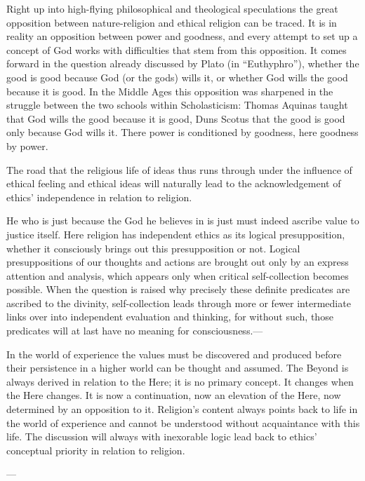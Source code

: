 \documentclass[12pt,a4paper]{book}
\newcommand{\opage}[1]{\marginnote{\footnotesize\textit{[#1]}}}
\begin{document}
Right up into high-flying philosophical and theological speculations the great opposition between
nature-religion and ethical religion can be traced. It is in reality an opposition between power and
goodness, and every attempt to set up a concept of God works with difficulties that stem from this
opposition. It comes forward in the question already discussed by Plato (in ``Euthyphro''), whether the good
is good because God (or the gods) wills it, or whether God wills the good because it is good. In the Middle
Ages this opposition was sharpened in the struggle between the two schools within Scholasticism: Thomas
Aquinas taught that God wills the good because it is good, Duns Scotus that the good is good only because
God wills it. There power is conditioned by goodness, here goodness by power.

The road that the religious life of ideas thus runs through under the influence of ethical feeling and
ethical ideas will naturally lead to the acknowledgement of ethics' independence in relation to religion.

He who is just because the God he believes in is just must indeed ascribe value to justice itself. Here
religion has independent ethics as its logical presupposition, whether it consciously brings out this
presupposition or not. Logical presuppositions of our thoughts and actions are brought out only by an
express attention and analysis, which appears only when critical self-collection becomes possible. When the
question is raised why precisely these definite predicates are ascribed to the divinity, self-collection
leads through more or fewer intermediate links over into independent evaluation and thinking, for without
such, those predicates will at last have no meaning for consciousness.---

In the world of experience the values must be discovered and produced before their persistence in a higher
world can be thought and assumed. The Beyond is always derived in relation to the Here; it 
\opage{215}is no primary
concept. It changes when the Here changes. It is now a continuation, now an elevation of the Here, now
determined by an opposition to it. Religion's content always points back to life in the world of experience
and cannot be understood without acquaintance with this life. The discussion will always with inexorable
logic lead back to ethics' conceptual priority in relation to religion.

\begin{center}---\end{center}
\end{document}
